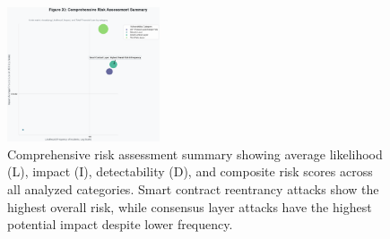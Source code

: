 \begin{figure}[H]
\centering
\includegraphics[width=0.4\textwidth]{../figure/Fig11.png}
\caption{Comprehensive risk assessment summary showing average likelihood (L), impact (I), detectability (D), and composite risk scores across all analyzed categories. Smart contract reentrancy attacks show the highest overall risk, while consensus layer attacks have the highest potential impact despite lower frequency.}
\label{fig:risk_scores_summary}
\end{figure}
